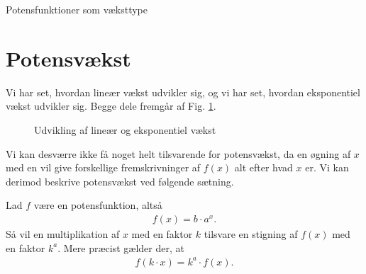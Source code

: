 \begin{center}
\Huge
Potensfunktioner som væksttype
\end{center}

\section*{Potensvækst}
Vi har set, hvordan lineær vækst udvikler sig, og vi har set, hvordan eksponentiel vækst udvikler sig. Begge dele fremgår af Fig. \ref{fig:lineks}.
\begin{figure}[H]
\centering
{}
\caption{Udvikling af lineær og eksponentiel vækst}
\label{fig:lineks}
\end{figure}
Vi kan desværre ikke få noget helt tilsvarende for potensvækst, da en øgning af $x$ med en vil give forskellige fremskrivninger af $f(x)$ alt efter hvad $x$ er. Vi kan derimod beskrive potensvækst ved følgende sætning.
\begin{setn}
Lad $f$ være en potensfunktion, altså 
\begin{align*}
f(x) = b\cdot a^x.
\end{align*}
Så vil en multiplikation af $x$ med en faktor $k$ tilsvare en stigning af $f(x)$ med en faktor $k^a$. Mere præcist gælder der, at 
\begin{align*}
f(k\cdot x) = k^a\cdot f(x).
\end{align*}
\end{setn}
